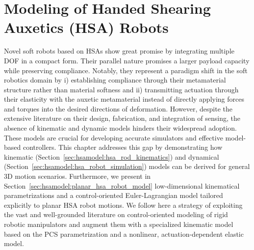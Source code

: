 \chapter{Modeling of Handed Shearing Auxetics (HSA) Robots}
\label{chp:hsamodel}

\begin{foreword}
    Novel soft robots based on \glspl{HSA} show great promise by integrating multiple \gls{DOF} in a compact form. Their parallel nature promises a larger payload capacity while preserving compliance. Notably, they represent a paradigm shift in the soft robotics domain by i) establishing compliance through their metamaterial structure rather than material softness and ii) transmitting actuation through their elasticity with the auxetic metamaterial instead of directly applying forces and torques into the desired directions of deformation.
    However, despite the extensive literature on their design, fabrication, and integration of sensing, the absence of kinematic and dynamic models hinders their widespread adoption. These models are crucial for developing accurate simulators and effective model-based controllers.
    This chapter addresses this gap by demonstrating how kinematic (Section~\ref{sec:hsamodel:hsa_rod_kinematics}) and dynamical (Section~\ref{sec:hsamodel:hsa_robot_simulation}) models can be derived for general 3D motion scenarios. Furthermore, we present in Section~\ref{sec:hsamodel:planar_hsa_robot_model} low-dimensional kinematical parametrizations and a control-oriented Euler-Lagrangian model tailored explicitly to planar \gls{HSA} robot motions.
    We follow here a strategy of exploiting the vast and well-grounded literature on control-oriented modeling of rigid robotic manipulators and augment them with a specialized kinematic model based on the \gls{PCS} parametrization and a nonlinear, actuation-dependent elastic model.
\end{foreword}

\pagebreak

